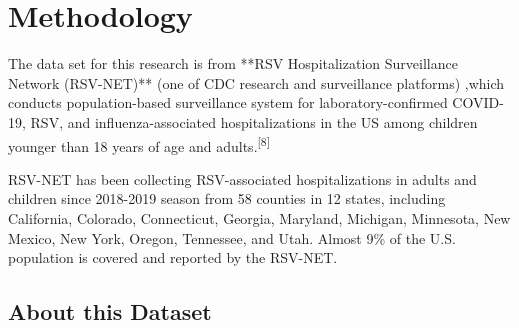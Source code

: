 \documentclass[
  letterpaper,
  DIV=11,
  numbers=noendperiod]{scrreport}
\begin{document}
\hypertarget{methodology}{%
\chapter{Methodology}\label{methodology}}

The data set for this research is from **RSV Hospitalization
Surveillance Network (RSV-NET)** (one of CDC research and surveillance
platforms) ,which conducts population-based surveillance system for
laboratory-confirmed COVID-19, RSV, and influenza-associated
hospitalizations in the US among children younger than 18 years of age
and adults.\textsuperscript{{[}8{]}}

RSV-NET has been collecting RSV-associated hospitalizations in adults
and children since 2018-2019 season from 58 counties in 12 states,
including California, Colorado, Connecticut, Georgia, Maryland,
Michigan, Minnesota, New Mexico, New York, Oregon, Tennessee, and Utah.
Almost 9\% of the U.S. population is covered and reported by the
RSV-NET.

\hypertarget{about-this-dataset}{%
\section{About this Dataset}\label{about-this-dataset}}
\end{document}

